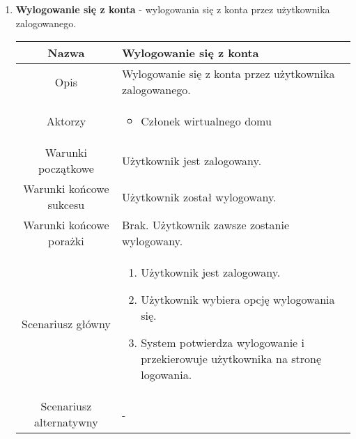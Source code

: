\documentclass{article}
\begin{document}
\begin{enumerate}
\begin{enumerate}
			\item \textbf{Wylogowanie się z konta} - wylogowania się z konta przez
				użytkownika zalogowanego.
				\begin{table}[H]
					\centering
					\begin{tabular}{|c|p{7cm}|}
						\hline
						Nazwa                   & \textbf{Wylogowanie się z konta}                                                                                                                                                                         \\
						\hline
						Opis                    & Wylogowanie się z konta przez użytkownika zalogowanego.                                                                                                                                                  \\
						\hline
						Aktorzy                 & \begin{itemize}\item Członek wirtualnego domu\end{itemize}                                                                                                                                               \\
						\hline
						Warunki początkowe      & Użytkownik jest zalogowany.                                                                                                                                                                              \\
						\hline
						Warunki końcowe sukcesu & Użytkownik został wylogowany.                                                                                                                                                                            \\
						\hline
						Warunki końcowe porażki & Brak. Użytkownik zawsze zostanie wylogowany.                                                                                                                                                             \\
						\hline
						Scenariusz główny       & \begin{enumerate}\item Użytkownik jest zalogowany.

\item Użytkownik wybiera opcję wylogowania się.

\item System potwierdza wylogowanie i przekierowuje użytkownika na stronę logowania.\end{enumerate} \\
						\hline
						Scenariusz alternatywny & -                                                                                                                                                                                                        \\
						\hline
					\end{tabular}
				\end{table}


\end{enumerate}
\end{enumerate}
\end{document}
